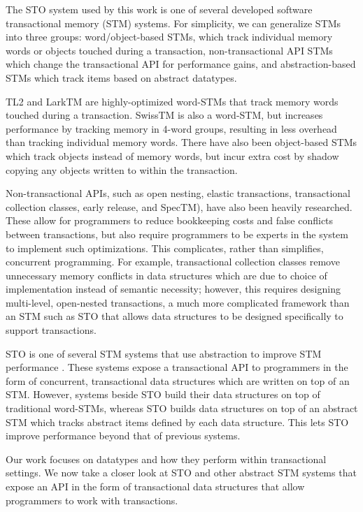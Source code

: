 The STO system\cite{sto} used by this work is one of several developed software transactional memory (STM) systems. For simplicity, we can generalize STMs into three groups: word/object-based STMs, which track individual memory words or objects touched during a transaction, non-transactional API STMs which change the transactional API for performance gains, and abstraction-based STMs which track items based on abstract datatypes.

TL2\cite{tl2} and LarkTM\cite{larktm} are highly-optimized word-STMs that track memory words touched during a transaction. SwissTM\cite{swisstm} is also a word-STM, but increases performance by tracking memory in 4-word groups, resulting in less overhead than tracking individual memory words. There have also been object-based STMs which track objects instead of memory words, but incur extra cost by shadow copying any objects written to within the transaction. 

Non-transactional APIs, such as open nesting\cite{opennesting}, elastic transactions\cite{elastic}, transactional collection classes\cite{tcc}, early release\cite{earlyrelease}, and SpecTM\cite{spectm}), have also been heavily researched. These allow for programmers to reduce bookkeeping costs and false conflicts between transactions, but also require programmers to be experts in the system to implement such optimizations. This complicates, rather than simplifies, concurrent programming. For example, transactional collection classes remove unnecessary memory conflicts in data structures which are due to choice of implementation instead of semantic necessity; however, this requires designing multi-level, open-nested transactions, a much more complicated framework than an STM such as STO that allows data structures to be designed specifically to support transactions.

STO is one of several STM systems that use abstraction to improve STM performance \cite{boost}\cite{optboost}\cite{autolock}\cite{predication}. These systems expose a transactional API to programmers in the form of concurrent, transactional data structures which are written on top of an STM. However, systems beside STO build their data structures on top of traditional word-STMs, whereas STO builds data structures on top of an abstract STM which tracks abstract items defined by each data structure. This lets STO improve performance beyond that of previous systems. 

Our work focuses on datatypes and how they perform within transactional settings. We now take a closer look at STO and other abstract STM systems that expose an API in the form of transactional data structures that allow programmers to work with transactions.


